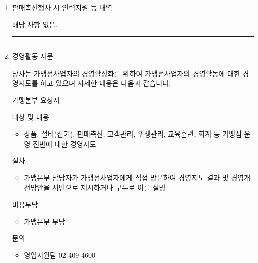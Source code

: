 \documentclass[a5paper,10pt]{oblivoir}
\newcommand\crule[3][black]{\textcolor{#1}{\rule{#2}{#3}}}
\begin{document}
\begin{enumerate}
\newpage
\begin{center}
\crule[red]{4cm}{0.1cm} \crule[blue]{4cm}{0.1cm}
\end{center}
\item  판매촉진행사 시 인력지원 등 내역

 해당 사항 없음.

\newpage
\begin{center}
\crule[red]{4cm}{0.1cm} \crule[blue]{4cm}{0.1cm}
\end{center}
\item 경영활동 자문

당사는 가맹점사업자의 경영활성화를 위하여 가맹점사업자의 경영활동에 대한 경영지도를 하고 있으며 자세한 내용은 다음과 같습니다.

\begin{tiny}
\begin{Form}
\def\LayoutCheckField#1#2{%
  \parbox[c][5mm]{5mm}{\centering\footnotesize\strut #1\\#2}%
}
\def\LayoutCheckField#1#2{%
  \makebox[0pt][l]{%
    \makebox[5mm][c]{\footnotesize\strut #1}%
  }%
  #2%
}
\def\DefaultHeightofCheckBox{5mm}
\def\DefaultWidthofCheckBox{5mm}

\rule{0cm}{.5cm}

 가맹본부 요청시

\noindent\dotfill 
 대상 및 내용

\begin{itemize}
\item 상품, 설비(집기), 판매촉진, 고객관리, 위생관리, 교육훈련, 회계 등 가맹점 운영 전반에 대한 경영지도
\end{itemize}

\noindent\dotfill 
 절차

\begin{itemize}
\item 가맹본부 담당자가 가맹점사업자에게 직접 방문하여 경영지도 결과 및 경영개선방안을 서면으로 제시하거나 구두로 이를 설명
\end{itemize}

\noindent\dotfill 
  비용부담

\begin{itemize}
\item 가맹본부 부담
\end{itemize}

\noindent\dotfill 
 문의

\begin{itemize}
\item 영업지원팀 02 409 4600
\end{itemize}


\end{Form}
\end{tiny}
\end{enumerate}
\end{document}
